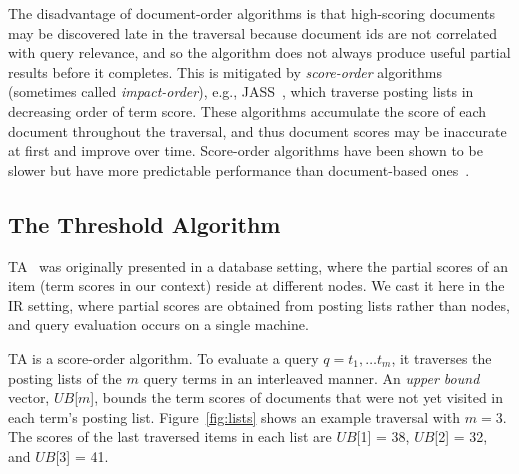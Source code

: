 
The disadvantage of  document-order algorithms is that high-scoring documents may  be discovered late in the traversal because document ids  are not correlated with query relevance,
and so the algorithm does not always produce useful partial results before it completes.
This is mitigated by \emph{score-order} algorithms (sometimes called \emph{impact-order}), e.g.,  JASS~\cite{Lin:2015}, which traverse posting lists in decreasing order of term score. 
These algorithms accumulate the score of each document throughout the traversal, and thus document scores may be inaccurate at first and improve over time. 
Score-order algorithms have been shown to be slower but have more predictable performance than document-based ones~\cite{Crane:2017}.

\subsection{The Threshold Algorithm}

TA~\cite{Fagin:2003} was originally presented in a database setting, where the partial scores of an item (term scores in our context)  reside at different nodes. We cast it here in the IR setting, where partial scores are obtained from posting lists rather than nodes, and query evaluation occurs on a single machine.

TA is a score-order algorithm.
To evaluate a query $q = t_1, \dots t_m$, it traverses the posting lists of the $m$ query terms in an interleaved manner. 
An \emph{upper bound} vector, $UB$[$m$], 
bounds the term scores of documents that were not yet visited in each term's posting list. 
%
Figure~\ref{fig:lists} shows
an example traversal with $m=3$.  The scores of the last traversed items in each list are $UB$[1] = 38, $UB$[2] = 32, and $UB$[3] = 41. 


